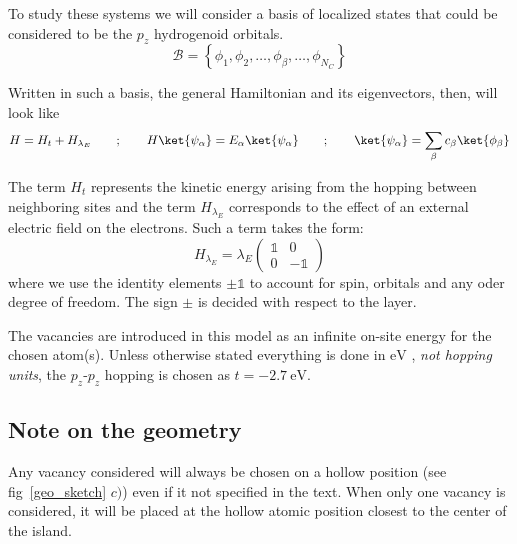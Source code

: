 To study these systems we will consider a basis of localized states that could be considered to be the $p_z$ hydrogenoid orbitals.
\begin{equation}
  \mathcal{B} = \left\{\phi_1,\phi_2,\dots,\phi_\beta,\dots,\phi_{N_C}\right\}
\end{equation}

Written in such a basis, the general Hamiltonian and its eigenvectors, then, will look like
\begin{equation}
  H = H_t + H_{\lambda_E} \quad\quad;\quad\quad
  H\ket{\psi_\alpha} = E_\alpha\ket{\psi_\alpha} \quad\quad;\quad\quad
  \ket{\psi_\alpha} = \sum_\beta c_\beta\ket{\phi_\beta}
\label{general}
\end{equation}


The term $H_t$ represents the kinetic energy arising from the hopping between neighboring sites and the term $H_{\lambda_E}$ corresponds to the effect of an external electric field on the electrons. Such a term takes the form:
\begin{equation}
  H_{\lambda_E} = \lambda_E
  \left(\begin{array}{cc}
  \mathds{1} & 0 \\
  0 & -\mathds{1}
  \end{array}\right)
\end{equation}
where we use the identity elements $\pm\mathds{1}$ to account for spin, orbitals and any oder degree of freedom. The sign $\pm$ is decided with respect to the layer.

The vacancies are introduced in this model as an infinite on-site energy for the chosen atom(s). Unless otherwise stated everything is done in $\si{\eV}$ %
, \emph{not hopping units}, the $p_z$-$p_z$ hopping is chosen as $t=\SI{-2.7}{\eV}$.





\subsection{Note on the geometry}
Any vacancy considered will always be chosen on a hollow position (see fig~\ref{geo_sketch} $c)$) even if it not specified in the text. When only one vacancy is considered, it will be placed at the hollow atomic position closest to the center of the island.

